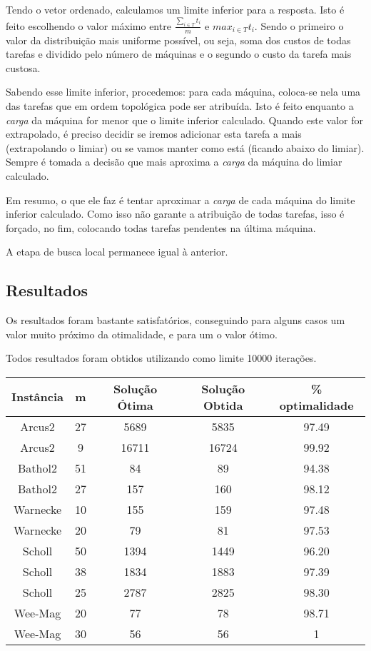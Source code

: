 \documentclass{report}
\begin{document}
Tendo o vetor ordenado, calculamos um limite inferior para a
resposta. Isto é feito escolhendo o valor máximo entre $\frac{\sum_{i\in T}t_i}{m}$
 e $max_{i\in T}t_i$. Sendo o primeiro
o valor da distribuição mais uniforme possível, ou seja,
soma dos custos de todas tarefas e dividido pelo
número de máquinas e o segundo o custo da tarefa mais custosa.

Sabendo esse limite inferior, procedemos: para cada máquina, coloca-se
nela uma das tarefas que em ordem topológica pode ser atribuída.
Isto é feito enquanto a \emph{carga}
da máquina for menor que o limite inferior
calculado. Quando este valor for extrapolado, é preciso decidir se iremos
adicionar esta tarefa a mais
(extrapolando o limiar) ou se vamos manter como está (ficando abaixo do limiar).
Sempre é tomada a decisão que mais
aproxima a \emph{carga} da máquina do limiar calculado.

Em resumo, o que ele faz é tentar aproximar a \emph{carga} de
cada máquina do limite inferior calculado.
Como isso não garante a atribuição de todas tarefas, isso é forçado, no fim,
colocando todas tarefas pendentes na última máquina.

A etapa de busca local permanece igual à anterior.

\subsection{Resultados}

Os resultados foram bastante satisfatórios, conseguindo para alguns casos um
valor muito próximo da otimalidade, e para um o valor ótimo.

Todos resultados foram obtidos utilizando como limite 10000 iterações.

\begin{table}[htbp]
 \begin{tabular}{|c|c|c|c|c|}
  \hline
  \textbf{Instância} & \textbf{m} & \textbf{Solução Ótima} & \textbf{Solução Obtida} & \% optimalidade \\
  \hline
  Arcus2 & 27 & 5689 & 5835 & 97.49 \\
  \hline
  Arcus2 & 9 & 16711 & 16724 & 99.92 \\
  \hline
  Bathol2 & 51 & 84 & 89 & 94.38 \\
  \hline
  Bathol2 & 27 & 157 & 160 & 98.12 \\
  \hline
  Warnecke & 10 & 155 & 159 & 97.48 \\
  \hline
  Warnecke & 20 & 79 & 81 & 97.53 \\
  \hline
  Scholl & 50 & 1394 & 1449 & 96.20 \\
  \hline
  Scholl & 38 & 1834 & 1883 & 97.39 \\
  \hline
  Scholl & 25 & 2787 & 2825 & 98.30 \\
  \hline
  Wee-Mag & 20 & 77 & 78 & 98.71 \\
  \hline
  Wee-Mag & 30 & 56 & 56 & 1 \\
  \hline
 \end{tabular}
\end{table}
\end{document}
